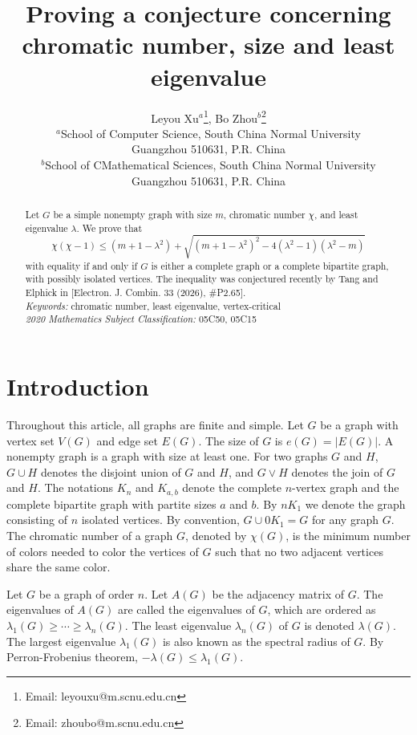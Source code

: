 \documentclass[12pt]{article}
\title{Proving a conjecture concerning chromatic number, size and least eigenvalue}
\author{Leyou Xu$^a$\footnote{Email: leyouxu@m.scnu.edu.cn}, Bo Zhou$^b$\footnote{Email: zhoubo@m.scnu.edu.cn}\\
$^a$School of Computer Science, South China Normal University\\
Guangzhou 510631, P.R. China\\
$^b$School of CMathematical Sciences, South China Normal University\\
Guangzhou 510631, P.R. China
}
\date{}
\begin{document}
\maketitle

\begin{abstract}
Let $G$ be a simple nonempty graph with size $m$, chromatic number $\chi$, and least 
eigenvalue $\lambda$. We prove that 
\[
\chi(\chi-1) \le (m+1-\lambda^2)
 + \sqrt{(m+1-\lambda^2)^2-4(\lambda^2-1)(\lambda^2-m)} 
\]
with equality if and only if $G$ is either a complete graph or a complete bipartite graph, with possibly 
isolated vertices. The inequality was conjectured recently by 
Tang and Elphick in [Electron. J. Combin. 33 (2026), \#P2.65].
\\

\noindent
\textit{Keywords:} chromatic number, least eigenvalue, vertex-critical\\

\noindent
{\it 2020 Mathematics Subject Classification:} 05C50, 05C15
\end{abstract}

\section{Introduction}

Throughout this article, all graphs  are finite and simple. Let $G$ be a graph with vertex set $V(G)$ and edge set $E(G)$. The size of $G$ is $e(G)=|E(G)|$. 
A nonempty graph is a graph with size at least one. For two graphs $G$ and $H$, $G\cup H$ denotes the disjoint union of $G$ and $H$, and $G\vee H$ denotes the join of $G$ and $H$. The notations $K_n$ and $K_{a,b}$ denote the complete $n$-vertex graph and the complete bipartite graph with partite sizes $a$ and $b$. By $nK_1$ we denote the graph consisting of $n$ isolated vertices. By convention, $G\cup 0K_1=G$ for any graph $G$.
The chromatic number of a graph $G$, denoted by $\chi(G)$, is the minimum number of colors needed to color the vertices of $G$ such that no two adjacent vertices share the same color. 

Let $G$ be a graph of order $n$. 
Let $A(G)$ be the adjacency matrix of $G$. The eigenvalues of $A(G)$ are called the eigenvalues of  $G$, which are ordered as $\lambda_1(G)\ge \cdots\ge \lambda_n(G)$.  The least eigenvalue $\lambda_n(G)$ of $G$ is  denoted $\lambda (G)$. The largest eigenvalue $\lambda_1(G)$ is also known as the spectral radius of $G$. By Perron-Frobenius theorem, $-\lambda (G)\le \lambda_1(G)$.
\end{document}
